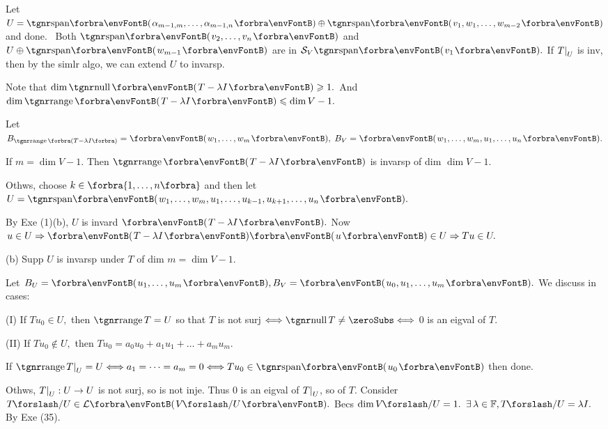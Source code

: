 Let $U=\Span{\alpha_{m-1,m},\dots,\alpha_{m-1,n}}\oplus\Span{v_1,w_1,\dots,w_{m-2}}$ and done.\PfEnd\quad\Ha
\Comment \,\,\,Both $\Span{v_2,\dots,v_n}$ and $U\oplus\Span{w_{m-1}}$ are in $\mathcal{S}_V \Span{v_1}.$\parCom\quad\Ha
{\tgsl If $T\text{\normalsize|}_U$ is inv, then by the simlr algo, we can extend $U$ to invarsp.}\par\vspace{6pt}\quad\Ha
\Or Note that $\dim\null\Par{T-\lambda I}\geqslant 1.$ And $\dim\range\Par{T-\lambda I}\leqslant\dim V-1.$\par\quad\Ha
Let $B_{\range\SmallPar{T-\lambda I}}=\Par{w_1,\dots,w_m},\;B_V=\Par{w_1,\dots,w_m,u_1,\dots,u_n}.$\par\quad\Ha
If $m=\dim V-1.$  Then $\range\Par{T-\lambda I}$ is invarsp of dim $\dim V-1.$\par\quad\Ha
Othws, choose $k\in\Bra{1,\dots,n}$ and then let $U=\Span{w_1,\dots,w_m,u_1,\dots,u_{k-1},u_{k+1},\dots,u_n}.$\par\quad\Ha
By Exe (1)(b), $U$ is invard $\Par{T-\lambda I}.$ Now $u\in U\Rightarrow \Par{T-\lambda I}\Par{u}\in U\Rightarrow Tu\in U.$\par\vspace{6pt}\quad
(b) Supp $U$ is invarsp under $T$ of dim $m=\dim V-1.$ \par\quad\Hb
Let $B_U=\Par{u_1,\dots,u_m},B_V=\Par{u_0,u_1,\dots,u_m}.$ We discuss in cases:\par\quad\Hb
(I) If $Tu_0\in U,$ then $\range T=U$ so that $T$ is not surj $\Longleftrightarrow \null T\neq\zeroSubs\Longleftrightarrow$ $0$ is an eigval of $T.$\par\quad\Hb\EndI
(II) If $Tu_0\not\in U,$ then $Tu_0=a_0 u_0+a_1 u_1+\dots+a_mu_m.$\par\quad\Hb\EndII
If $\range T\mmid_U=U\Longleftrightarrow a_1=\dots=a_m=0\Longleftrightarrow Tu_0\in\Span{u_0}$ then done.\par\quad\Hb\EndII
Othws, $T\text{\normalsize|}_U:U\rightarrow U$ is not surj, so is not inje. Thus $0$ is an eigval of $T\text{\normalsize|}_U$, so of $T.$\PfEnd\vspace{4pt}\quad\Hb
\Or Consider $T\XSlash U\in\Lm{V\XSlash U}.$ Becs $\dim V\XSlash U=1.$ $\exists\,\lambda\in\Fbb,T\XSlash U=\lambda I.$ By Exe (35).\PfEnd
\SepLine
\ChEnd\pagebreak

\large\vspace{5pt}

